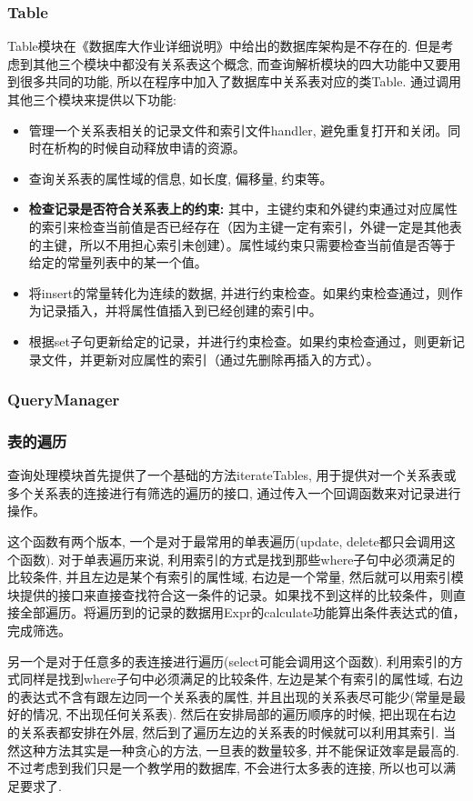 \documentclass[11pt,UTF8]{report}
\begin{document}
\subsubsection{Table}
Table模块在《数据库大作业详细说明》中给出的数据库架构是不存在的. 但是考虑到其他三个模块中都没有关系表这个概念, 而查询解析模块的四大功能中又要用到很多共同的功能, 所以在程序中加入了数据库中关系表对应的类Table. 通过调用其他三个模块来提供以下功能:
\begin{itemize}
	\item 管理一个关系表相关的记录文件和索引文件handler, 避免重复打开和关闭。同时在析构的时候自动释放申请的资源。
	\item 查询关系表的属性域的信息, 如长度, 偏移量, 约束等。
	\item \textbf{检查记录是否符合关系表上的约束:} 其中，主键约束和外键约束通过对应属性的索引来检查当前值是否已经存在（因为主键一定有索引，外键一定是其他表的主键，所以不用担心索引未创建）。属性域约束只需要检查当前值是否等于给定的常量列表中的某一个值。
	\item 将insert的常量转化为连续的数据, 并进行约束检查。如果约束检查通过，则作为记录插入，并将属性值插入到已经创建的索引中。
	\item 根据set子句更新给定的记录，并进行约束检查。如果约束检查通过，则更新记录文件，并更新对应属性的索引（通过先删除再插入的方式）。
\end{itemize}

\subsubsection{QueryManager}
\subsubsection{表的遍历}
查询处理模块首先提供了一个基础的方法iterateTables, 用于提供对一个关系表或多个关系表的连接进行有筛选的遍历的接口, 通过传入一个回调函数来对记录进行操作。

这个函数有两个版本, 一个是对于最常用的单表遍历(update, delete都只会调用这个函数). 对于单表遍历来说, 利用索引的方式是找到那些where子句中必须满足的比较条件, 并且左边是某个有索引的属性域, 右边是一个常量, 然后就可以用索引模块提供的接口来直接查找符合这一条件的记录。如果找不到这样的比较条件，则直接全部遍历。将遍历到的记录的数据用Expr的calculate功能算出条件表达式的值，完成筛选。

另一个是对于任意多的表连接进行遍历(select可能会调用这个函数). 利用索引的方式同样是找到where子句中必须满足的比较条件, 左边是某个有索引的属性域, 右边的表达式不含有跟左边同一个关系表的属性, 并且出现的关系表尽可能少(常量是最好的情况, 不出现任何关系表). 然后在安排局部的遍历顺序的时候, 把出现在右边的关系表都安排在外层, 然后到了遍历左边的关系表的时候就可以利用其索引. 当然这种方法其实是一种贪心的方法, 一旦表的数量较多, 并不能保证效率是最高的. 不过考虑到我们只是一个教学用的数据库, 不会进行太多表的连接, 所以也可以满足要求了.
\end{document}
